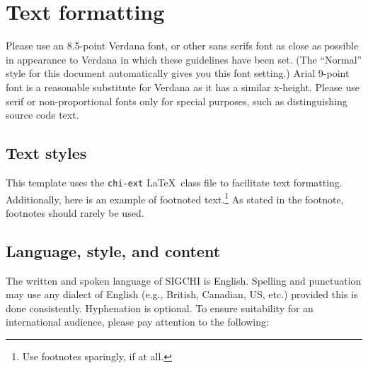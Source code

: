 \documentclass{sigchi-ext}
\begin{document}
\section{Text formatting}
Please use an 8.5-point Verdana font, or other sans serifs font as close as possible in appearance to Verdana in which these guidelines have been set. 
(The ``Normal'' style for this document automatically gives you this font setting.)
Arial 9-point font is a reasonable substitute for Verdana as it has a similar x-height. 
Please use serif or non-proportional fonts only for special purposes, such as distinguishing source code text.

\subsection{Text styles}
This template uses the \texttt{chi-ext} \LaTeX\ class file to facilitate text formatting.
Additionally, here is an example of footnoted text.\footnote{Use footnotes sparingly, if at all.}
As stated in the footnote, footnotes should rarely be used.

\subsection{Language, style, and content}
The written and spoken language of SIGCHI is English. 
Spelling and punctuation may use any dialect of English (e.g., British, Canadian, US, etc.) provided this is done consistently. 
Hyphenation is optional. 
To ensure suitability for an international audience, please pay attention to the following:
\end{document}
